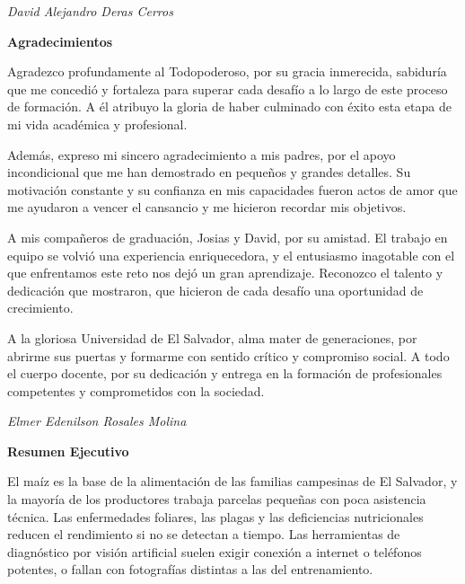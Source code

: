 \documentclass[12pt,letterpaper]{report}
\begin{document}
\begin{flushright}
\textit{David Alejandro Deras Cerros}
\end{flushright}

\newpage
\begin{center}
{\large\bfseries Agradecimientos\par}
\end{center}
\vspace{0.5cm}

\noindent Agradezco profundamente al Todopoderoso, por su gracia inmerecida, sabidur\'ia que me concedi\'o y fortaleza para superar cada desaf\'io a lo largo de este proceso de formaci\'on. A \'el atribuyo la gloria de haber culminado con \'exito esta etapa de mi vida acad\'emica y profesional.

\noindent Adem\'as, expreso mi sincero agradecimiento a mis padres, por el apoyo incondicional que me han demostrado en peque\~nos y grandes detalles. Su motivaci\'on constante y su confianza en mis capacidades fueron actos de amor que me ayudaron a vencer el cansancio y me hicieron recordar mis objetivos.

\noindent A mis compa\~neros de graduaci\'on, Josias y David, por su amistad. El trabajo en equipo se volvi\'o una experiencia enriquecedora, y el entusiasmo inagotable con el que enfrentamos este reto nos dej\'o un gran aprendizaje. Reconozco el talento y dedicaci\'on que mostraron, que hicieron de cada desaf\'io una oportunidad de crecimiento. 

\noindent A la gloriosa Universidad de El Salvador, alma mater de generaciones, por abrirme sus puertas y formarme con sentido cr\'itico y compromiso social. A todo el cuerpo docente, por su dedicaci\'on y entrega en la formaci\'on de profesionales competentes y comprometidos con la sociedad.

\begin{flushright}
\textit{Elmer Edenilson Rosales Molina}
\end{flushright}

\newpage
\begin{center}
{\Large\bfseries Resumen Ejecutivo\par}
\end{center}
\vspace{0.3cm}

\onehalfspacing
El ma\'iz es la base de la alimentaci\'on de las familias campesinas de El Salvador, y la mayor\'ia de los productores trabaja parcelas peque\~nas con poca asistencia t\'ecnica. Las enfermedades foliares, las plagas y las deficiencias nutricionales reducen el rendimiento si no se detectan a tiempo. Las herramientas de diagn\'ostico por visi\'on artificial suelen exigir conexi\'on a internet o tel\'efonos potentes, o fallan con fotograf\'ias distintas a las del entrenamiento.
\end{document}
